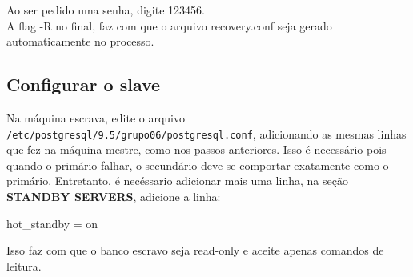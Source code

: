 \documentclass[a4paper,10pt]{article}
\begin{document}
        Ao ser pedido uma senha, digite 123456.\\
        A flag -R no final, faz com que o arquivo recovery.conf seja gerado automaticamente no processo.

    \subsection{Configurar o slave}
        Na máquina escrava, edite o arquivo \verb|/etc/postgresql/9.5/grupo06/postgresql.conf|, adicionando as mesmas linhas que fez na máquina mestre, como nos passos anteriores. Isso é necessário pois quando o primário falhar, o secundário deve se comportar exatamente como o primário. Entretanto, é necéssario adicionar mais uma linha, na seção \textbf{STANDBY SERVERS}, adicione a linha:
        \begin{spverbatim}
        hot_standby = on
        \end{spverbatim}

        Isso faz com que o banco escravo seja read-only e aceite apenas comandos de leitura.
\end{document}
